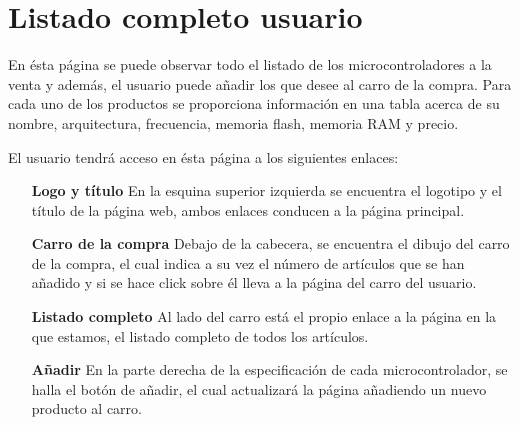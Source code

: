 \section{Listado completo usuario}

En ésta página se puede observar todo el listado de los microcontroladores a la venta y además, el usuario puede añadir los que desee al carro de la compra.
Para cada uno de los productos se proporciona información en una tabla acerca de su nombre, arquitectura, frecuencia, memoria flash, memoria RAM y precio.

El usuario tendrá acceso en ésta página a los siguientes enlaces:

\begin{itemize}
	\item[\textbf{Logo y título}] En la esquina superior izquierda se encuentra el logotipo y el título de la página web, ambos enlaces conducen a la página principal.

	\item[\textbf{Carro de la compra}] Debajo de la cabecera, se encuentra el dibujo del carro de la compra, el cual indica a su vez el número de artículos que se han añadido y si se hace click sobre él lleva a la página del carro del usuario.
	
	\item[\textbf{Listado completo}] Al lado del carro está el propio enlace a la página en la que estamos, el listado completo de todos los artículos.
	
	\item[\textbf{Añadir}] En la parte derecha de la especificación de cada microcontrolador, se halla el botón de añadir, el cual actualizará la página añadiendo un nuevo producto al carro.
\end{itemize}